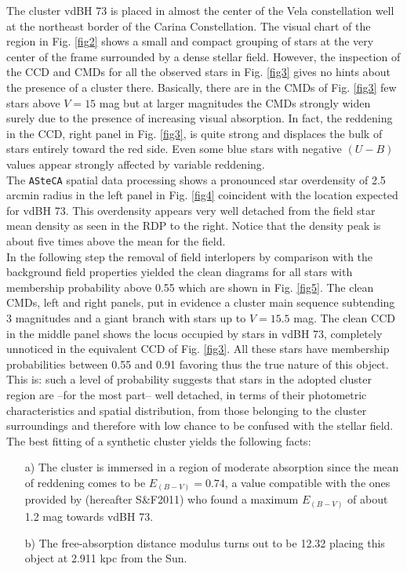 \documentclass{aa}
\begin{document}
The cluster vdBH 73 is placed in almost the center of the Vela
constellation well at the northeast border of the Carina Constellation. The
visual chart of the region in Fig. \ref{fig2} shows a small and compact grouping
of stars at the very center of the frame surrounded by a dense stellar field.
However, the inspection of the CCD and CMDs for all the observed stars in
Fig. \ref{fig3} gives no hints about the presence of a
cluster there. Basically, there are in the CMDs of Fig. \ref{fig3} few stars
above $V=15$ mag but at larger magnitudes the CMDs strongly widen surely due to
the presence of increasing visual absorption. In fact, the reddening in the
CCD, right panel in Fig. \ref{fig3}, is quite strong and displaces the bulk of
stars entirely toward the red side. Even some blue stars with negative $(U-B)$
values appear strongly affected by variable reddening.\\

The \texttt{ASteCA} spatial data processing shows a pronounced star overdensity
of 2.5 arcmin radius in the left panel in Fig. \ref{fig4} coincident with the
location expected for vdBH 73. This overdensity appears very well
detached from the field star mean density as seen in the RDP to the right.
Notice that the density peak is about five times above the mean for the field.\\

In the following step the removal of field interlopers by comparison with the
background field properties yielded the clean diagrams for all stars with
membership probability above 0.55 which are shown in Fig. \ref{fig5}. The clean
CMDs, left and right panels, put in evidence a cluster main sequence subtending
3 magnitudes and a giant branch with stars up to $V = 15.5$ mag. The clean CCD
in the middle panel shows the locus occupied by stars in vdBH 73,
completely unnoticed in the equivalent CCD of Fig. \ref{fig3}. All these stars
have membership probabilities between 0.55 and 0.91 favoring thus the true
nature of this object. This is: such a level of probability suggests that stars
in the adopted cluster region are --for the most part-- well detached, in terms
of their photometric characteristics and spatial distribution, from those
belonging to the cluster surroundings and therefore with low chance to be
confused with the stellar field. The best fitting of a synthetic cluster
yields the following facts:

\begin{itemize}
\item [a)] The cluster is immersed in a region of moderate absorption since the
mean of reddening comes to be $E_{(B-V)} = 0.74$, a value compatible with the
ones provided by \cite{Schlafly_2011} (hereafter S\&F2011) who
found a maximum $E_{(B-V)}$ of about 1.2 mag towards vdBH 73.
\item [b)] The free-absorption distance modulus turns out to be 12.32 placing
this object at 2.911 kpc from the Sun.
\end{itemize}
\end{document}
